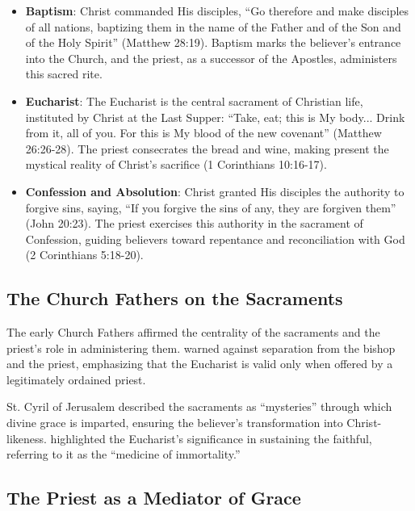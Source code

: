 \documentclass[12pt,doc]{apa7}   	%
\begin{document}
\begin{itemize}
    \item \textbf{Baptism}: Christ commanded His disciples, ``Go therefore and make disciples of all nations, baptizing them in the name of the Father and of the Son and of the Holy Spirit'' (Matthew 28:19). Baptism marks the believer’s entrance into the Church, and the priest, as a successor of the Apostles, administers this sacred rite.
    
    \item \textbf{Eucharist}: The Eucharist is the central sacrament of Christian life, instituted by Christ at the Last Supper: ``Take, eat; this is My body... Drink from it, all of you. For this is My blood of the new covenant'' (Matthew 26:26-28). The priest consecrates the bread and wine, making present the mystical reality of Christ’s sacrifice (1 Corinthians 10:16-17).

    \item \textbf{Confession and Absolution}: Christ granted His disciples the authority to forgive sins, saying, ``If you forgive the sins of any, they are forgiven them'' (John 20:23). The priest exercises this authority in the sacrament of Confession, guiding believers toward repentance and reconciliation with God (2 Corinthians 5:18-20).
\end{itemize}

\subsection{The Church Fathers on the Sacraments}

The early Church Fathers affirmed the centrality of the sacraments and the priest’s role in administering them. \cite{epistles_ignatius} warned against separation from the bishop and the priest, emphasizing that the Eucharist is valid only when offered by a legitimately ordained priest. 

St. Cyril of Jerusalem \citep{early_church_akin} described the sacraments as ``mysteries'' through which divine grace is imparted, ensuring the believer’s transformation into Christ-likeness. \citet{priesthood_chrysostom,complete_work_chrysostom} highlighted the Eucharist’s significance in sustaining the faithful, referring to it as the ``medicine of immortality.''

\subsection{The Priest as a Mediator of Grace}
\end{document}
